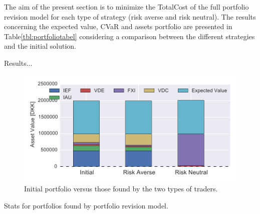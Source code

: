 The aim of the present section is to minimize the TotalCost of the full portfolio revision model for each type of strategy (risk averse and risk neutral).
The results concerning the expected value, CVaR and assets portfolio are presented in Table\ref{tbl:portfoliotabel} considering a comparison between the different strategies and the initial solution. 

Results...




\begin{figure}[tp]
\centering
\includegraphics{../pic/portfoliorevision_portfolio.pdf}
\caption{Initial portfolio versus those found by the two types of traders.}
\label{fig:prevpf}
\end{figure}

\begin{table}
\caption{Stats for portfolios found by portfolio revision model.}\label{tbl:portfoliotabel}
\centering

\end{table}